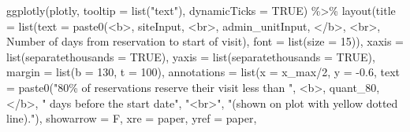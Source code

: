 \documentclass[
  11 pt,
  openany]{book}
\newenvironment{Shaded}{\begin{snugshade}}{\end{snugshade}}
\newcommand{\AttributeTok}[1]{\textcolor[rgb]{0.77,0.63,0.00}{#1}}
\newcommand{\ConstantTok}[1]{\textcolor[rgb]{0.00,0.00,0.00}{#1}}
\newcommand{\DecValTok}[1]{\textcolor[rgb]{0.00,0.00,0.81}{#1}}
\newcommand{\FloatTok}[1]{\textcolor[rgb]{0.00,0.00,0.81}{#1}}
\newcommand{\FunctionTok}[1]{\textcolor[rgb]{0.00,0.00,0.00}{#1}}
\newcommand{\NormalTok}[1]{#1}
\newcommand{\SpecialCharTok}[1]{\textcolor[rgb]{0.00,0.00,0.00}{#1}}
\newcommand{\StringTok}[1]{\textcolor[rgb]{0.31,0.60,0.02}{#1}}
\begin{document}
\begin{Shaded}
\begin{Highlighting}[]
\FunctionTok{ggplotly}\NormalTok{(plotly,}
         \AttributeTok{tooltip =} \FunctionTok{list}\NormalTok{(}\StringTok{"text"}\NormalTok{),}
         \AttributeTok{dynamicTicks =} \ConstantTok{TRUE}\NormalTok{) }\SpecialCharTok{\%\textgreater{}\%} 
  \FunctionTok{layout}\NormalTok{(}\AttributeTok{title =} \FunctionTok{list}\NormalTok{(}\AttributeTok{text =} \FunctionTok{paste0}\NormalTok{(}\StringTok{\textquotesingle{}\textless{}b\textgreater{}\textquotesingle{}}\NormalTok{, siteInput, }\StringTok{\textquotesingle{}\textless{}br\textgreater{}\textquotesingle{}}\NormalTok{, admin\_unitInput, }\StringTok{\textquotesingle{}\textless{}/b\textgreater{}\textquotesingle{}}\NormalTok{,}
                                    \StringTok{\textquotesingle{}\textless{}br\textgreater{}\textquotesingle{}}\NormalTok{,}
                                    \StringTok{\textquotesingle{}Number of days from reservation to start of visit\textquotesingle{}}\NormalTok{),}
                      \AttributeTok{font =} \FunctionTok{list}\NormalTok{(}\AttributeTok{size =} \DecValTok{15}\NormalTok{)),}
         \AttributeTok{xaxis =} \FunctionTok{list}\NormalTok{(}\AttributeTok{separatethousands =} \ConstantTok{TRUE}\NormalTok{),}
         \AttributeTok{yaxis =} \FunctionTok{list}\NormalTok{(}\AttributeTok{separatethousands =} \ConstantTok{TRUE}\NormalTok{),}
         \AttributeTok{margin =} \FunctionTok{list}\NormalTok{(}\AttributeTok{b =} \DecValTok{130}\NormalTok{, }\AttributeTok{t =} \DecValTok{100}\NormalTok{), }
         \AttributeTok{annotations =}  \FunctionTok{list}\NormalTok{(}\AttributeTok{x =}\NormalTok{ x\_max}\SpecialCharTok{/}\DecValTok{2}\NormalTok{, }\AttributeTok{y =} \SpecialCharTok{{-}}\FloatTok{0.6}\NormalTok{, }
                             \AttributeTok{text =} \FunctionTok{paste0}\NormalTok{(}\StringTok{"80\% of reservations reserve their visit less than "}\NormalTok{, }
                                           \StringTok{\textquotesingle{}\textless{}b\textgreater{}\textquotesingle{}}\NormalTok{, quant\_80, }\StringTok{\textquotesingle{}\textless{}/b\textgreater{}\textquotesingle{}}\NormalTok{, }
                                           \StringTok{" days before the start date"}\NormalTok{, }
                                           \StringTok{"\textless{}br\textgreater{}"}\NormalTok{,}
                                           \StringTok{"(shown on plot with yellow dotted line)."}\NormalTok{), }
                             \AttributeTok{showarrow =}\NormalTok{ F, }
                             \AttributeTok{xre =} \StringTok{\textquotesingle{}paper\textquotesingle{}}\NormalTok{, }\AttributeTok{yref =} \StringTok{\textquotesingle{}paper\textquotesingle{}}\NormalTok{, }

\end{Highlighting}
\end{Shaded}
\end{document}
